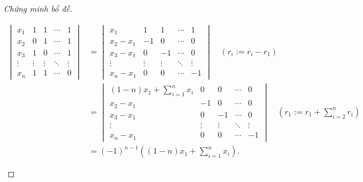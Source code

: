 \documentclass[class=nhvh-linear-algebra,crop=false]{standalone}
\begin{document}
\begin{proof}[Chứng minh bổ đề]
\begin{enumerate}[label = (\roman*)]
              \begingroup{}
              \allowdisplaybreaks{}
              \begin{align*}
                  \begin{vmatrix}
                      x_{1}  & 1      & 1      & \cdots & 1      \\
                      x_{2}  & 0      & 1      & \cdots & 1      \\
                      x_{3}  & 1      & 0      & \cdots & 1      \\
                      \vdots & \vdots & \vdots & \ddots & \vdots \\
                      x_{n}  & 1      & 1      & \cdots & 0
                  \end{vmatrix}
                   & =
                  \begin{vmatrix}
                      x_{1}         & 1      & 1      & \cdots & 1      \\
                      x_{2} - x_{1} & -1     & 0      & \cdots & 0      \\
                      x_{3} - x_{1} & 0      & -1     & \cdots & 0      \\
                      \vdots        & \vdots & \vdots & \ddots & \vdots \\
                      x_{n} - x_{1} & 0      & 0      & \cdots & -1
                  \end{vmatrix}\quad(r_{i}:= r_{i} - r_{1})                                 \\
                   & =
                  \begin{vmatrix}
                      (1-n)x_{1} + \displaystyle\sum^{n}_{i=1}x_{i} & 0      & 0      & \cdots & 0      \\
                      x_{2} - x_{1}                                 & -1     & 0      & \cdots & 0      \\
                      x_{3} - x_{1}                                 & 0      & -1     & \cdots & 0      \\
                      \vdots                                        & \vdots & \vdots & \ddots & \vdots \\
                      x_{n} - x_{1}                                 & 0      & 0      & \cdots & -1
                  \end{vmatrix}\quad(r_{1}:= r_{1} + \sum^{n}_{i=2}r_{i}) \\
                   & = {(-1)}^{n-1}\left((1-n)x_{1} + \sum^{n}_{i=1}x_{i}\right).
              \end{align*}
              \endgroup{}


\end{enumerate}
\end{proof}
\end{document}

